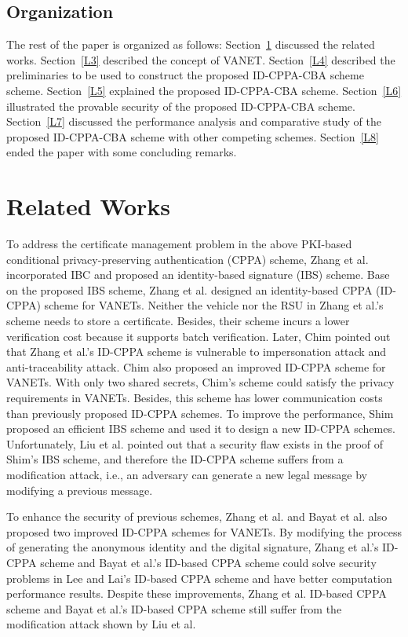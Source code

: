 \documentclass[10pt,journal,letterpaper]{IEEEtran}
\begin{document}
\subsection{Organization}
The rest of the paper is organized as follows: Section~\ref{L2}
discussed the related works. Section~\ref{L3} described the concept
of VANET.  Section~\ref{L4} described the preliminaries to be used
to construct the proposed ID-CPPA-CBA scheme scheme.
Section~\ref{L5} explained the proposed ID-CPPA-CBA scheme.
Section~\ref{L6} illustrated the provable security of the proposed
ID-CPPA-CBA scheme. Section~\ref{L7} discussed the performance
analysis and comparative study of the proposed ID-CPPA-CBA scheme
with other competing schemes. Section~\ref{L8} ended the paper with
some concluding remarks.

\section{Related Works}
\label{L2} To address the certificate management problem in the
above PKI-based conditional privacy-preserving authentication (CPPA)
scheme, Zhang et al. \cite{r2} incorporated IBC and proposed an
identity-based signature (IBS) scheme. Base on the proposed IBS
scheme, Zhang et al. designed an identity-based CPPA (ID-CPPA)
scheme for VANETs.  Neither the vehicle nor the RSU in Zhang et
al.'s scheme needs to store a certificate. Besides, their scheme
incurs a lower verification cost because it supports batch
verification. Later, Chim \cite{r9} pointed out that Zhang et al.'s
ID-CPPA scheme \cite{r2} is vulnerable to impersonation attack and
anti-traceability attack. Chim \cite{r9} also proposed an improved
ID-CPPA scheme for VANETs. With only two shared secrets, Chim's
scheme \cite{r9} could satisfy the privacy requirements in VANETs.
Besides, this scheme has lower communication costs than previously
proposed ID-CPPA schemes. To improve the performance, Shim \cite{r1}
proposed an efficient IBS scheme and used it to design a new ID-CPPA
schemes. Unfortunately, Liu et al. \cite{r10} pointed out that a
security flaw exists in the proof of Shim's IBS scheme, and
therefore the ID-CPPA scheme suffers from a modification attack,
i.e., an adversary can generate a new legal message by modifying a
previous message.




To enhance the security of previous schemes, Zhang et al. \cite{r2}
and Bayat et al. \cite{r3} also proposed two improved ID-CPPA
schemes for VANETs. By modifying the process of generating the
anonymous identity and the digital signature, Zhang et al.'s ID-CPPA
scheme \cite{r13} and Bayat et al.’s \cite{r3} ID-based CPPA
scheme could solve security problems in Lee and Lai’s ID-based
CPPA scheme \cite{r11} and have better computation performance
results. Despite these improvements, Zhang et al. ID-based CPPA
scheme \cite{r13} and Bayat et al.'s ID-based CPPA scheme \cite{r3}
still suffer from the modification attack shown by Liu et al.
\cite{r10}
\end{document}
